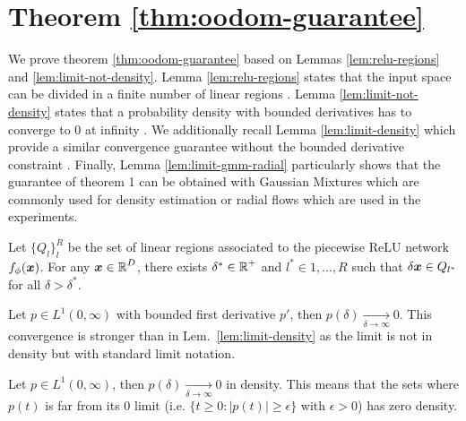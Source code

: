 \section{Theorem \ref{thm:oodom-guarantee}}
\label{sec:proofs}

We prove theorem \ref{thm:oodom-guarantee} based on Lemmas \ref{lem:relu-regions} and \ref{lem:limit-not-density}. Lemma \ref{lem:relu-regions} states that the input space can be divided in a finite number of linear regions \citep{understanding-nn-relu}. Lemma \ref{lem:limit-not-density} states that a probability density with bounded derivatives has to converge to $0$ at infinity \citep{limit-existence-infinity}. We additionally recall Lemma \ref{lem:limit-density} which provide a similar convergence guarantee without the bounded derivative constraint \citep{integrable-infinity}. Finally, Lemma \ref{lem:limit-gmm-radial} particularly shows that the guarantee of theorem 1 can be obtained with Gaussian Mixtures which are commonly used for density estimation or radial flows which are used in the experiments.

\begin{lemma}
\label{lem:relu-regions}
\citep{understanding-nn-relu} Let $\{Q_l\}_l^{R}$ be the set of linear regions associated to the piecewise ReLU network $f_{\phi}(\bm{x})$. For any $\bm{x} \in \operatorname{\mathbb{R}}^D$, there exists $\delta^* \in \operatorname{\mathbb{R}}^{+}$ and $l^*\in {1,..., R}$ such that $\delta \bm{x} \in Q_{l^*}$ for all $\delta > \delta^*$.
\end{lemma}

\begin{lemma}
\label{lem:limit-not-density}
\citep{limit-existence-infinity} Let $p \in L^1(0, \infty)$ with bounded first derivative $p'$, then $p(\delta)\underset{\delta \rightarrow \infty}{\rightarrow} 0$. This convergence is stronger than in Lem.~\ref{lem:limit-density} as the limit is not in density but with standard limit notation.
\end{lemma}

\begin{lemma}
\label{lem:limit-density}
\citep{integrable-infinity} Let $p \in L^1(0, \infty)$, then $p(\delta)\underset{\delta \rightarrow \infty}{\rightarrow} 0$ in density. This means that the sets where $p(t)$ is far from its $0$ limit (i.e. $\{ t \geq 0: |p(t)| \geq \epsilon \}$ with $\epsilon > 0$) has zero density.
\end{lemma}

